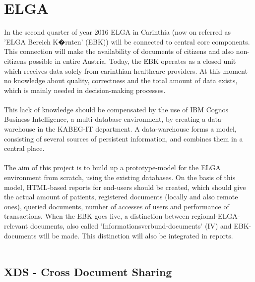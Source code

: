 \documentclass[a4paper]{article}
\begin{document}
	\section{ELGA }
	In the second quarter of year 2016 ELGA in Carinthia (now on referred as 'ELGA Bereich
	K�rnten' (EBK)) will be connected to central core components. This connection will make
	the availability of documents of citizens and 
	also non-citizens possible in entire Austria. Today, the EBK operates
	as a closed unit which receives data solely from carinthian healthcare providers. 
	At this moment no knowledge about quality, correctness and the total amount of data
	exists, which is mainly needed in decision-making processes.\\
	\\
 	This lack of knowledge should be compensated by the use of IBM Cognos Business 
 	Intelligence, a multi-database environment, by creating a data-warehouse in the KABEG-IT
 	department. A data-warehouse forms a model, consisting of several sources of persistent
 	information, and combines them in a central place.\\
 	\\
	The aim of this project is to build up a prototype-model for the ELGA environment from 
	scratch, using the existing databases. On the basis of this model, HTML-based reports 
	for end-users should be created, which should give the actual amount of patients,
	registered documents (locally and also remote ones), queried documents, number 
	of accesses of users and performance of transactions. When the EBK goes live, a distinction
	between regional-ELGA-relevant documents, also called 'Informationsverbund-documents' (IV)
	and EBK-documents will be made. This distinction will also be integrated in reports.\\
	\\
	
	\subsection{XDS - Cross Document Sharing}
	
\end{document}

